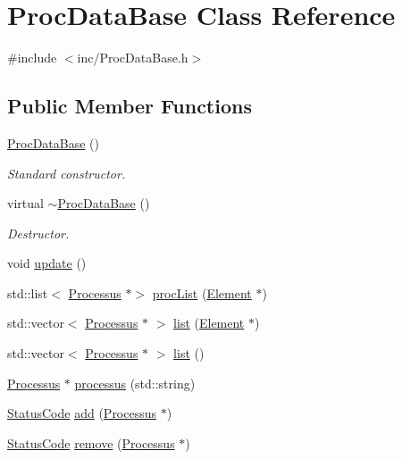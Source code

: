 \hypertarget{classProcDataBase}{}\section{Proc\+Data\+Base Class Reference}
\label{classProcDataBase}


{\ttfamily \#include $<$inc/\+Proc\+Data\+Base.\+h$>$}

\subsection*{Public Member Functions}
\begin{DoxyCompactItemize}
\item 
\hyperlink{classProcDataBase_a82163dfca2df460ba2ea1559ffa72179}{Proc\+Data\+Base} ()
\begin{DoxyCompactList}\small\item\em Standard constructor. \end{DoxyCompactList}\item 
virtual \hyperlink{classProcDataBase_a65ec1212978a4996b5132bfaf1d0738d}{$\sim$\+Proc\+Data\+Base} ()
\begin{DoxyCompactList}\small\item\em Destructor. \end{DoxyCompactList}\item 
void \hyperlink{classProcDataBase_a604959db08c3871d863a799cc4e1d5f4}{update} ()
\item 
std\+::list$<$ \hyperlink{classProcessus}{Processus} $\ast$$>$ \hyperlink{classProcDataBase_a8145de34e9857f3f6eebd2572740f198}{proc\+List} (\hyperlink{classElement}{Element} $\ast$)
\item 
std\+::vector$<$ \hyperlink{classProcessus}{Processus} $\ast$ $>$ \hyperlink{classProcDataBase_a6f17bfad64929fa887c6aafb0080354b}{list} (\hyperlink{classElement}{Element} $\ast$)
\item 
std\+::vector$<$ \hyperlink{classProcessus}{Processus} $\ast$ $>$ \hyperlink{classProcDataBase_a813dbc8f9e7c4d69074a01394f04fc98}{list} ()
\item 
\hyperlink{classProcessus}{Processus} $\ast$ \hyperlink{classProcDataBase_a839b15c7bc0d73f5ff0f2516c3cb418e}{processus} (std\+::string)
\item 
\hyperlink{classStatusCode}{Status\+Code} \hyperlink{classProcDataBase_a0aafeb65a41b92a6d1fdd67f363ef826}{add} (\hyperlink{classProcessus}{Processus} $\ast$)
\item 
\hyperlink{classStatusCode}{Status\+Code} \hyperlink{classProcDataBase_a0413976bac8f233b31eab6d7a83866b9}{remove} (\hyperlink{classProcessus}{Processus} $\ast$)
\end{DoxyCompactItemize}
